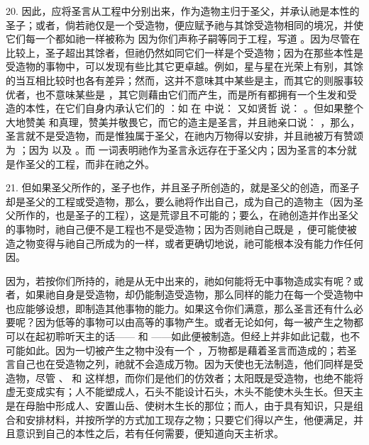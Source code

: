 20. 因此，应将圣言从工程中分别出来，作为造物主归于圣父，并承认祂是本性的圣子；或者，倘若祂仅是一个受造物，便应赋予祂与其馀受造物相同的境况，并使它们每一个都如祂一样被称为  因为你们声称子嗣等同于工程，写道 。因为尽管在比较上，圣子超出其馀者，但祂仍然如同它们一样是个受造物；因为在那些本性是受造物的事物中，可以发现有些比其它更卓越。例如，星与星在光荣上有别，其馀的当互相比较时也各有差异；然而，这并不意味其中某些是主，而其它的则服事较优者，也不意味某些是 ，其它则藉由它们而产生，而是所有都拥有一个生发和受造的本性，在它们自身内承认它们的 ：如  在  中说： 又如贤哲  说： 。但如果整个大地赞美  和真理，赞美并敬畏它，而它的造主是圣言，并且祂亲口说： ，那么，圣言就不是受造物，而是惟独属于圣父，在祂内万物得以安排，并且祂被万有赞颂为 ；因为  以及  。而  一词表明祂作为圣言永远存在于圣父内；因为圣言的本分就是作圣父的工程，而非在祂之外。\par

21. 但如果圣父所作的，圣子也作，并且圣子所创造的，就是圣父的创造，而圣子却是圣父的工程或受造物，那么，要么祂将作出自己，成为自己的造物主（因为圣父所作的，也是圣子的工程），这是荒谬且不可能的；要么，在祂创造并作出圣父的事物时，祂自己便不是工程也不是受造物；因为否则祂自己既是 ，便可能使被造之物变得与祂自己所成为的一样，或者更确切地说，祂可能根本没有能力作任何因。\par

因为，若按你们所持的，祂是从无中出来的，祂如何能将无中事物造成实有呢？或者，如果祂自身是受造物，却仍能制造受造物，那么同样的能力在每一个受造物中也应能够设想，即制造其他事物的能力。如果这令你们满意，那么圣言还有什么必要呢？因为低等的事物可以由高等的事物产生。或者无论如何，每一被产生之物都可以在起初聆听天主的话—— 和 ——如此便被制造。但经上并非如此记载，也不可能如此。因为一切被产生之物中没有一个 ，万物都是藉着圣言而造成的；若圣言自己也在受造物之列，祂就不会造成万物。因为天使也无法制造，他们同样是受造物，尽管 、 和  这样想，而你们是他们的仿效者；太阳既是受造物，也绝不能将虚无变成实有；人不能塑成人，石头不能设计石头，木头不能使木头生长。但天主是在母胎中形成人、安置山岳、使树木生长的那位；而人，由于具有知识，只是组合和安排材料，并按所学的方式加工现存之物；只要它们得以产生，他便满足，并且意识到自己的本性之后，若有任何需要，便知道向天主祈求。\par

